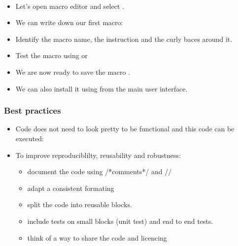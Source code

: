 \begin{frame}[fragile]
  \begin{example}~\par
  \begin{itemize}
  \item Let's open macro editor and select .
  \item We can write down our first macro:\par
    
  \item Identify the macro name, the instruction and the curly baces around it.
  \item Test the macro using  or 
  \item We are now ready to save the macro .
  \item We can also install it using  from the main user interface.
  \end{itemize}
\end{example}
\end{frame}

\begin{frame}[fragile]
  \frametitle<presentation>{Best practices}
  \begin{itemize}
  \item<1-> Code does not need to look pretty to be
    functional and this code can be executed:\par
    
  \item<2-> To improve reproduciblilty, reusability and robustness:
    \begin{itemize}
      \item document the code using  \textcolor{green!50!black}{/*comments*/} and  \textcolor{green!50!black}{//}
      \item adapt a consistent formating
      \item split the code into reusable blocks.
      \item include tests on small blocks (unit test) and end to end tests.
      \item think of a way to share the code and licencing
    \end{itemize}
  \end{itemize}
\end{frame}

